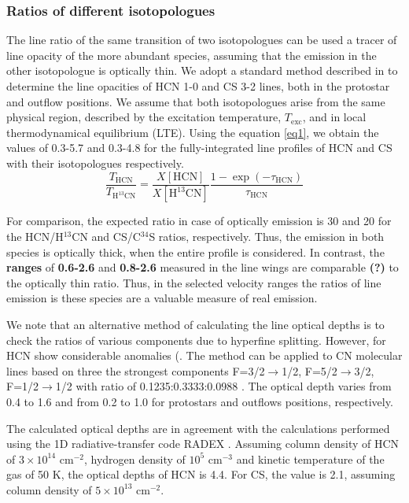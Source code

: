 \documentclass{aa}
\begin{document}
\subsubsection{Ratios of different isotopologues}
 
The line ratio of the same transition of two isotopologues can be used a tracer of 
line opacity of the more abundant species, assuming that the emission in the 
other isotopologue is optically thin. We adopt a standard method described in \citep{Gol84} 
to determine the line opacities of HCN 1-0 and CS 3-2 lines, both in the protostar 
and outflow positions. We assume that both isotopologues arise from the 
same physical region, described by the excitation temperature, $T_\mathrm{exc}$, and 
in local thermodynamical equilibrium (LTE). Using the equation \ref{eq1}, we obtain
the values of 0.3-5.7 and 0.3-4.8 for the fully-integrated line profiles of HCN and CS with their isotopologues respectively.
\begin{equation} 
\label{eq1} \frac{T_{\mathrm{HCN}}}{T_{\mathrm{H^{13}CN}}} =
\frac{X[\mathrm{HCN}]}{X[\mathrm{H^{13}CN}]} \frac
{1-\exp(-\tau_{\mathrm{HCN}})}{\tau_{\mathrm{HCN}}} 
\end{equation} 

For comparison, the expected ratio in case of optically emission is 30 and 20 for 
the HCN/H$^{13}$CN \citep{Dan13} and CS/C$^{34}$S \citep{Ter10} ratios, respectively. Thus, 
the emission in both species is optically thick, when the entire profile is considered.
In contrast, the \textbf{ranges} of \textbf{0.6-2.6} and \textbf{0.8-2.6} measured in the line wings are comparable \textbf{(?)} to 
the optically thin ratio. Thus, in the selected velocity ranges the ratios of line emission
is these species are a valuable measure of real emission. 

We note that an alternative method of calculating the line optical depths is to check 
the ratios of various components due to hyperfine splitting. However, for HCN show 
considerable anomalies (\citep{Lou12}. The method can be applied to CN molecular lines based on three the strongest components F=3/2$\rightarrow$1/2, F=5/2$\rightarrow$3/2, F=1/2$\rightarrow$1/2 with ratio of 0.1235:0.3333:0.0988 \citep{Ska83}. The optical depth varies from 0.4 to 1.6 and from 0.2 to 1.0 for protostars and outflows positions, respectively. 

The calculated optical depths are in agreement with the calculations performed using the 
1D radiative-transfer code RADEX \citep{vdT07}. Assuming column density of 
HCN of $3 \times 10^{14}$ cm$^{-2}$, hydrogen density of $10^5$ cm$^{-3}$ and kinetic temperature of
the gas of 50 K, the optical depths of HCN is 4.4.
For CS, the value is 2.1, assuming column density of $5 \times 10^{13}$ cm$^{-2}$. 
\end{document}
